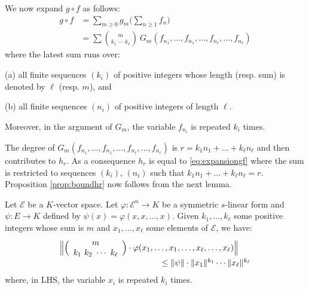 \documentclass{sig-alternate}
\begin{document}
We now expand $g \circ f$ as follows:
\begin{align}
g \circ f & = \sum_{m \geq 0} g_m \Big(\sum_{n \geq 1} f_n\Big) \nonumber \\
& = \sum \binom m {\!k_1 \,\, \cdots \,\, k_\ell\!} \:
G_m(f_{n_1}, \ldots, f_{n_1}, \ldots, f_{n_\ell}, \ldots, f_{n_\ell})
\label{eq:expansiongf}
\end{align}
where the latest sum runs over:

\noindent
(a) all finite sequences $(k_i)$ of positive integers whose length 
(resp. sum) is denoted by $\ell$ (resp. $m$), and

\noindent
(b) all finite sequences $(n_i)$ of positive integers of length
$\ell$.

\noindent
Moreover, in the argument of $G_m$, the variable $f_{n_i}$ 
is repeated $k_i$ times.

The degree of $G_m(f_{n_1}, \ldots, f_{n_1}, \ldots, f_{n_\ell},
\ldots, f_{n_\ell})$ is $r = k_1 n_1 + \ldots + k_\ell n_\ell$ and 
then contributes to $h_r$. As a consequence $h_r$ is equal to 
\eqref{eq:expansiongf} where the sum is restricted to sequences
$(k_i)$, $(n_i)$ such that $k_1 n_1 + \ldots + k_\ell n_\ell = r$.
Proposition \ref{prop:boundhr} now follows from the next lemma.

\begin{lem}
Let $\mathcal E$ be a $K$-vector space. Let $\varphi : \mathcal E^n \to 
K$ be a symmetric $s$-linear form and $\psi: E \to K$ defined by 
$\psi(x) = \varphi(x, x, \ldots, x)$.
Given $k_1, \ldots, k_\ell$ some positive integers whose sum is $m$ and 
$x_1, \ldots, x_\ell$ some elements of $\mathcal E$, we have:
$$\begin{array}{l}
\Big\Vert \binom m {k_1 \,\, k_2 \,\, \cdots \,\, k_\ell} \cdot
\varphi(x_1, \ldots, x_1, \ldots, x_\ell, \ldots,
x_\ell) \Big\Vert  \\
\hspace{4.3cm} \leq \Vert \psi \Vert \cdot \Vert x_1 \Vert^{k_1} \cdots
 \Vert x_\ell \Vert^{k_\ell}
\end{array}$$
where, in LHS, the variable $x_i$ is repeated $k_i$ times.
\end{lem}
\end{document}
